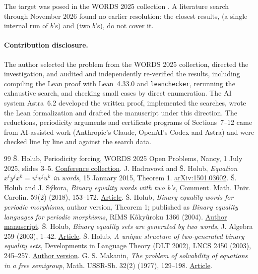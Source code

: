 \documentclass[10pt]{article}
\theoremstyle{remark}\newtheorem*{remark}{Remark}
\begin{document}
The target was posed in the WORDS 2025 collection \cite[p.~5]{words}. A literature search through November 2026 found no earlier resolution: the closest results, \cite[Theorem~1]{hh} (a single internal run of \(b\)'s) and \cite[Theorem~30]{hs} (two \(b\)'s), do not cover it.

\paragraph{Contribution disclosure.}
The author selected the problem from the WORDS 2025 collection, directed the investigation, and audited and independently re-verified the results, including compiling the Lean proof with Lean~4.33.0 and \texttt{leanchecker}, rerunning the exhaustive search, and checking small cases by direct enumeration. The AI system Astra~6.2 developed the written proof, implemented the searches, wrote the Lean formalization and drafted the manuscript under this direction. The reductions, periodicity arguments and certificate programs of Sections~7--12 came from AI-assisted work (Anthropic's Claude, OpenAI's Codex and Astra) and were checked line by line and against the search data.

\begin{thebibliography}{99}
\v S. Holub, Periodicity forcing, WORDS 2025 Open Problems, Nancy, 1 July 2025, slides 3--5. \href{https://words2025.loria.fr/files/2025/07/webpage-open-problems.pdf}{Conference collection}.
J. Hadravov\'a and \v S. Holub, \emph{Equation \(x^iy^jx^k=u^iv^ju^k\) in words}, 15 January 2015, Theorem 1. \href{https://arxiv.org/abs/1501.03602}{arXiv:1501.03602}.
\v S. Holub and J. S\'ykora, \emph{Binary equality words with two b's}, Comment. Math. Univ. Carolin. 59(2) (2018), 153--172. \href{https://cmuc.karlin.mff.cuni.cz/pdf/cmuc1802/holsyk.pdf}{Article}.
\v S. Holub, \emph{Binary equality words for periodic morphisms}, author version, Theorem 1; published as \emph{Binary equality languages for periodic morphisms}, RIMS K\^oky\^uroku 1366 (2004). \href{https://www.karlin.mff.cuni.cz/~holub/soubory/rimsrevised.pdf}{Author manuscript}.
\v S. Holub, \emph{Binary equality sets are generated by two words}, J. Algebra 259 (2003), 1--42. \href{https://doi.org/10.1016/S0021-8693(02)00534-3}{Article}.
\v S. Holub, \emph{A unique structure of two-generated binary equality sets}, Developments in Language Theory (DLT 2002), LNCS 2450 (2003), 245--257. \href{https://www.karlin.mff.cuni.cz/~holub/soubory/uniq.pdf}{Author version}.
G. S. Makanin, \emph{The problem of solvability of equations in a free semigroup}, Math. USSR-Sb. 32(2) (1977), 129--198. \href{https://doi.org/10.1070/SM1977v032n02ABEH002376}{Article}.
\end{thebibliography}
\end{document}
